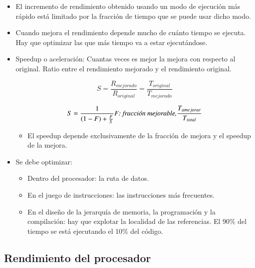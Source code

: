 \documentclass[12pt, twoside, openright]{report} %
\begin{document}
  \begin{itemize}
  
  \item
    El incremento de rendimiento obtenido usando un modo de ejecución
    más rápido está limitado por la fracción de tiempo que se puede usar
    dicho modo.
  \item
    Cuando mejora el rendimiento depende mucho de cuánto tiempo se
    ejecuta. Hay que optimizar las que más tiempo va a estar
    ejecutándose.
  \item
    Speedup o aceleración: Cuantas veces es mejor la mejora con respecto
    al original. Ratio entre el rendimiento mejorado y el rendimiento
    original.


    $$S=\frac {R_{mejorado}} {R_{original}}=\frac {T_{original}} {T_{mejorado}}$$

    $$S=\frac 1 {(1-F)+\frac F S} \textit{F: fracción mejorable,}
    \frac {T_{a\space mejorar}} {T_{total}}$$

    \begin{itemize}
    \item
      El speedup depende exclusivamente de la fracción de mejora y el
      speedup de la mejora.
      \begin{figure}[H]
        {\def\svgwidth{.7\textwidth}
         }
      \end{figure}
    \end{itemize}
  \item
    Se debe optimizar:

    \begin{itemize}
    
    \item
      Dentro del procesador: la ruta de datos.
    \item
      En el juego de instrucciones: las instrucciones más frecuentes.
    \item
      En el diseño de la jerarquía de memoria, la programación y la
      compilación: hay que explotar la localidad de las referencias. El
      90\% del tiempo se está ejecutando el 10\% del código.
    \end{itemize}
  \end{itemize}

  \subsection{Rendimiento del procesador}
\end{document}
